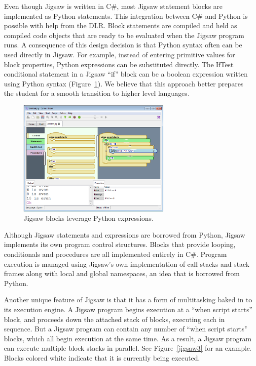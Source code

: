 \documentclass[preprint]{sigplanconf}
\begin{document}
Even though Jigsaw is written in C\#, most Jigsaw statement blocks are
implemented as Python statements. This integration between C\# and
Python is possible with help from the DLR. Block statements are
compiled and held as compiled code objects that are ready to be
evaluated when the Jigsaw program runs. A consequence of this design
decision is that Python syntax often can be used directly in
Jigsaw. For example, instead of entering primitive values for block
properties, Python expressions can be substituted directly. The IfTest
conditional statement in a Jigsaw ``if'' block can be a boolean
expression written using Python syntax (Figure~\ref{jigsaw2}). We
believe that this approach better prepares the student for a smooth
transition to higher level languages.

\begin{figure}[h!]
  \centering
    \includegraphics[width=75mm]{jigsaw2.eps} 
  \caption{Jigsaw blocks leverage Python expressions.}
  \label{jigsaw2}
\end{figure}

Although Jigsaw statements and expressions are borrowed from
Python, Jigsaw implements its own program control
structures. Blocks that provide looping, conditionals and procedures
are all implemented entirely in C\#. Program execution is managed
using Jigsaw's own implementation of call stacks and stack frames
along with local and global namespaces, an idea that is borrowed from
Python.

Another unique feature of Jigsaw is that it has a form of multitasking
baked in to its execution engine. A Jigsaw program begins execution at
a ``when script starts'' block, and proceeds down the attached stack
of blocks, executing each in sequence. But a Jigsaw program can
contain any number of ``when script starts'' blocks, which all begin
execution at the same time. As a result, a Jigsaw program can execute
multiple block stacks in parallel. See Figure~\ref{jigsaw3} for an
example. Blocks colored white indicate that it is currently being
executed.
\end{document}
